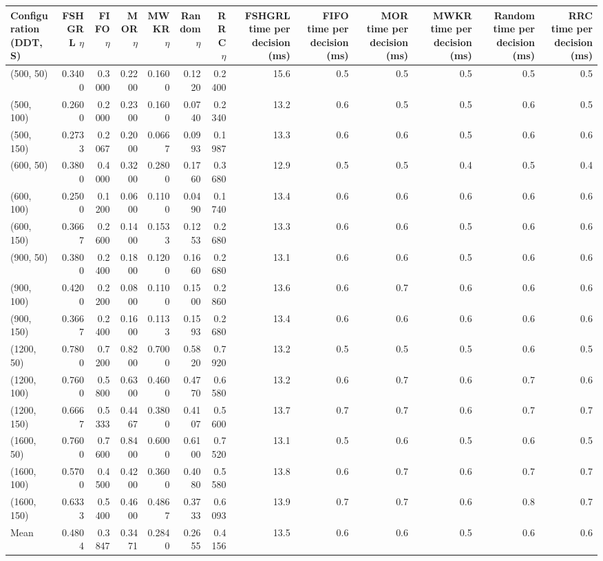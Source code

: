 \begin{tabular}{lrrrrrrrrrrrr}
\toprule
Configuration (DDT, S) & FSHGRL $\eta$ & FIFO $\eta$ & MOR $\eta$ & MWKR $\eta$ & Random $\eta$ & RRC $\eta$ & FSHGRL time per decision (ms) & FIFO time per decision (ms) & MOR time per decision (ms) & MWKR time per decision (ms) & Random time per decision (ms) & RRC time per decision (ms) \\
\midrule
(500, 50) & 0.3400 & 0.3000 & 0.2200 & 0.1600 & 0.1220 & 0.2400 & 15.6 & 0.5 & 0.5 & 0.5 & 0.5 & 0.5 \\
(500, 100) & 0.2600 & 0.2000 & 0.2300 & 0.1600 & 0.0740 & 0.2340 & 13.2 & 0.6 & 0.5 & 0.5 & 0.6 & 0.5 \\
(500, 150) & 0.2733 & 0.2067 & 0.2000 & 0.0667 & 0.0993 & 0.1987 & 13.3 & 0.6 & 0.6 & 0.5 & 0.6 & 0.6 \\
(600, 50) & 0.3800 & 0.4000 & 0.3200 & 0.2800 & 0.1760 & 0.3680 & 12.9 & 0.5 & 0.5 & 0.4 & 0.5 & 0.4 \\
(600, 100) & 0.2500 & 0.1200 & 0.0600 & 0.1100 & 0.0490 & 0.1740 & 13.4 & 0.6 & 0.6 & 0.6 & 0.6 & 0.6 \\
(600, 150) & 0.3667 & 0.2600 & 0.1400 & 0.1533 & 0.1253 & 0.2680 & 13.3 & 0.6 & 0.6 & 0.5 & 0.6 & 0.6 \\
(900, 50) & 0.3800 & 0.2400 & 0.1800 & 0.1200 & 0.1660 & 0.2680 & 13.1 & 0.6 & 0.6 & 0.5 & 0.6 & 0.6 \\
(900, 100) & 0.4200 & 0.2200 & 0.0800 & 0.1100 & 0.1500 & 0.2860 & 13.6 & 0.6 & 0.7 & 0.6 & 0.6 & 0.6 \\
(900, 150) & 0.3667 & 0.2400 & 0.1600 & 0.1133 & 0.1593 & 0.2680 & 13.4 & 0.6 & 0.6 & 0.6 & 0.6 & 0.6 \\
(1200, 50) & 0.7800 & 0.7200 & 0.8200 & 0.7000 & 0.5820 & 0.7920 & 13.2 & 0.5 & 0.5 & 0.5 & 0.6 & 0.5 \\
(1200, 100) & 0.7600 & 0.5800 & 0.6300 & 0.4600 & 0.4770 & 0.6580 & 13.2 & 0.6 & 0.7 & 0.6 & 0.7 & 0.6 \\
(1200, 150) & 0.6667 & 0.5333 & 0.4467 & 0.3800 & 0.4107 & 0.5600 & 13.7 & 0.7 & 0.7 & 0.6 & 0.7 & 0.7 \\
(1600, 50) & 0.7600 & 0.7600 & 0.8400 & 0.6000 & 0.6100 & 0.7520 & 13.1 & 0.5 & 0.6 & 0.5 & 0.6 & 0.5 \\
(1600, 100) & 0.5700 & 0.4500 & 0.4200 & 0.3600 & 0.4080 & 0.5580 & 13.8 & 0.6 & 0.7 & 0.6 & 0.7 & 0.7 \\
(1600, 150) & 0.6333 & 0.5400 & 0.4600 & 0.4867 & 0.3733 & 0.6093 & 13.9 & 0.7 & 0.7 & 0.6 & 0.8 & 0.7 \\
Mean & 0.4804 & 0.3847 & 0.3471 & 0.2840 & 0.2655 & 0.4156 & 13.5 & 0.6 & 0.6 & 0.5 & 0.6 & 0.6 \\
\bottomrule
\end{tabular}
